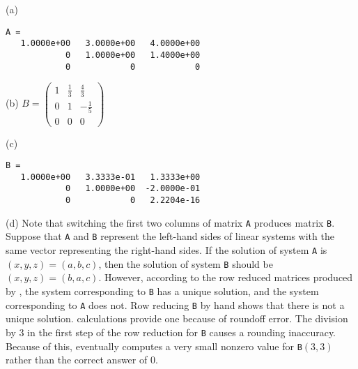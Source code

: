 \documentclass{ximera}
\begin{document}
\begin{exercise}
\begin{solution}

(a)
\begin{verbatim}
A =
   1.0000e+00   3.0000e+00   4.0000e+00
            0   1.0000e+00   1.4000e+00
            0            0            0
\end{verbatim}

(b)
$B = \left(\begin{array}{rrr}
1 & \frac{1}{3} & \frac{4}{3} \\
0 & 1 & -\frac{1}{5} \\
0 & 0 & 0\end{array} \right)$

(c)
\begin{verbatim}
B =
   1.0000e+00   3.3333e-01   1.3333e+00
            0   1.0000e+00  -2.0000e-01
            0            0   2.2204e-16
\end{verbatim}


(d) Note that switching the first two columns of matrix {\tt A} produces
matrix {\tt B}.  Suppose that {\tt A} and {\tt B} represent the left-hand
sides of linear systems with the same vector representing the right-hand
sides.  If the solution of system {\tt A} is $(x,y,z) = (a,b,c)$, then the
solution of system {\tt B} should be $(x,y,z) = (b,a,c)$.  However,
according to the row reduced matrices produced by \Matlab, the system
corresponding to {\tt B} has a unique solution, and the system
corresponding to {\tt A} does not.  Row reducing {\tt B} by hand shows
that there is not a unique solution.  \Matlab calculations provide one because of 
roundoff error.  The division by 3 in the first step of the row reduction
for {\tt B} causes a rounding inaccuracy.  Because of this, \Matlab
eventually computes a very small nonzero value for {\tt B}$(3,3)$
rather than the correct answer of 0.

\end{solution}
\end{exercise}
\end{document}
